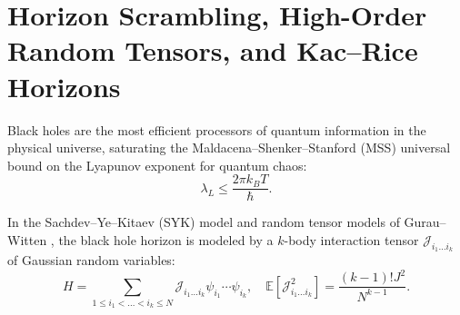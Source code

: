 \documentclass[11pt,a4paper,reqno]{amsart}
\theoremstyle{definition}
\numberwithin{equation}{section}
\begin{document}
\section{Horizon Scrambling, High-Order Random Tensors, and Kac--Rice Horizons}
\label{sec:horizon_scrambling}

Black holes are the most efficient processors of quantum information in the physical universe, saturating the Maldacena--Shenker--Stanford (MSS) universal bound on the Lyapunov exponent for quantum chaos:
\begin{equation}
    \label{eq:mss_bound}
    \lambda_L \le \frac{2\pi k_B T}{\hbar}.
\end{equation}

In the Sachdev--Ye--Kitaev (SYK) model and random tensor models of Gurau--Witten \cite{kitaev2015simple, maldacena2016bound}, the black hole horizon is modeled by a $k$-body interaction tensor $\mathcal{J}_{i_1 \dots i_k}$ of Gaussian random variables:
\begin{equation}
    H = \sum_{1 \le i_1 < \dots < i_k \le N} \mathcal{J}_{i_1 \dots i_k} \psi_{i_1} \cdots \psi_{i_k}, \quad \mathbb{E}[\mathcal{J}_{i_1 \dots i_k}^2] = \frac{(k-1)! J^2}{N^{k-1}}.
\end{equation}
\end{document}
